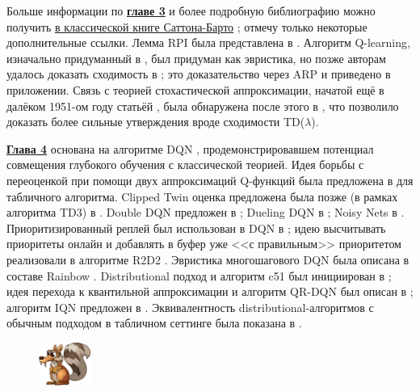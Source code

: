 Больше информации по \underline{\textbf{главе 3}} и более подробную библиографию можно получить \href{https://drive.google.com/file/d/1Z4W_-0IaMNpZnhnMkqcDVM_EA79GFJo-/view}{в классической книге Саттона-Барто} \cite{sutton2018reinforcement}; отмечу только некоторые дополнительные ссылки. Лемма RPI была представлена в \cite{kakade2002approximately}. Алгоритм Q-learning, изначально придуманный в \cite{watkins1989learning}, был придуман как эвристика, но позже авторам удалось доказать сходимость в \cite{watkins1992q}; это доказательство через ARP и приведено в приложении. Связь с теорией стохастической аппроксимации, начатой ещё в далёком 1951-ом году статьёй \cite{robbins1951stochastic}, была обнаружена после этого в \cite{tsitsiklis1994asynchronous}, что позволило доказать более сильные утверждения вроде сходимости TD($\lambda$).

\underline{\textbf{Глава 4}} основана на алгоритме DQN \cite{mnih2013playing}, продемонстрировавшем потенциал совмещения глубокого обучения с классической теорией. Идея борьбы с переоценкой при помощи двух аппроксимаций Q-функций была предложена в \cite{hasselt2010double} для табличного алгоритма. Clipped Twin оценка предложена была позже (в рамках алгоритма TD3) в \cite{fujimoto2018addressing}. Double DQN предложен в \cite{van2016deep}; Dueling DQN в \cite{wang2015dueling}; Noisy Nets в \cite{fortunato2017noisy}. Приоритизированный реплей был использован в DQN в \cite{schaul2015prioritized}; идею высчитывать приоритеты онлайн и добавлять в буфер уже <<с правильным>> приоритетом реализовали в алгоритме R2D2 \cite{horgan2018distributed}. Эвристика многошагового DQN была описана в составе Rainbow \cite{hessel2018rainbow}. Distributional подход и алгоритм c51 был инициирован в \cite{bellemare2017distributional}; идея перехода к квантильной аппроксимации и алгоритм QR-DQN был описан в \cite{dabney2018distributional}; алгоритм IQN предложен в \cite{dabney2018implicit}. Эквивалентность distributional-алгоритмов с обычным подходом в табличном сеттинге была показана в \cite{lyle2019comparative}.

\begin{figure}
\vspace{-0.5cm}
\centering
\includegraphics[width=0.15\textwidth]{Images/Scrat.png}
\vspace{-0.5cm}
\end{figure}

